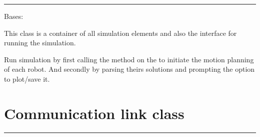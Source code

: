 \documentclass[letterpaper,10pt,english]{sphinxmanual}
\begin{document}
\bigskip\hrule{}\bigskip


\begin{fulllineitems}
\label{Multi-robot motion planner:planning_sim.WorldSim}
Bases: \href{http://docs.python.org/library/functions.html\#object}{}

This class is a container of all simulation elements and also the
interface for running the simulation.

\begin{fulllineitems}
\label{Multi-robot motion planner:planning_sim.WorldSim.run}
Run simulation by first calling the \href{http://docs.python.org/library/multiprocessing.html\#multiprocessing.Process.start}{} method on
the {\hyperref[Multi-robot motion planner:planning_sim.Robot.planning_process]{}} to
initiate the motion planning of each robot. And secondly by parsing theirs solutions and
prompting the option to plot/save it.

\end{fulllineitems}


\end{fulllineitems}



\section{Communication link class}
\label{Multi-robot motion planner:communication-link-class}
\begin{DUlineblock}{0em}
\item[] 
\end{DUlineblock}


\bigskip\hrule{}\bigskip

\end{document}
